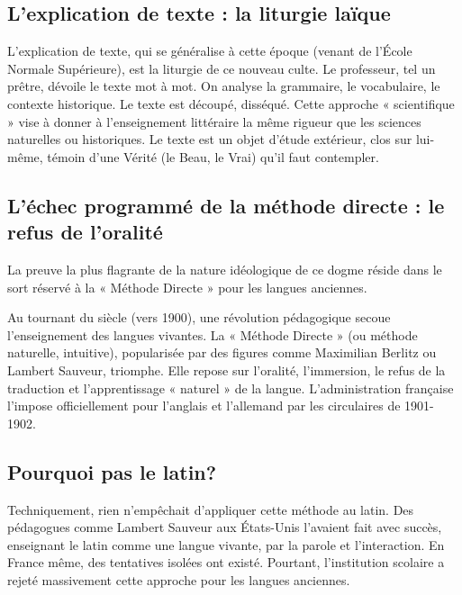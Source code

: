 \subsection{L'explication de texte : la liturgie laïque}

L'explication de texte, qui se généralise à cette époque (venant de l'École Normale Supérieure), est
la liturgie de ce nouveau culte. Le professeur, tel un prêtre, dévoile le texte mot à mot. On
analyse la grammaire, le vocabulaire, le contexte historique. Le texte est découpé, disséqué. Cette
approche « scientifique » vise à donner à l'enseignement littéraire la même rigueur que les sciences
naturelles ou historiques. Le texte est un objet d'étude extérieur, clos sur lui-même, témoin d'une
Vérité (le Beau, le Vrai) qu'il faut contempler.\cite{I-1-3-ref23}



\subsection{L'échec programmé de la méthode directe : le refus de l'oralité}

La preuve la plus flagrante de la nature idéologique de ce dogme réside dans le sort réservé à la «
Méthode Directe » pour les langues anciennes.

Au tournant du siècle (vers 1900), une révolution pédagogique secoue l'enseignement des langues
vivantes. La « Méthode Directe » (ou méthode naturelle, intuitive), popularisée par des figures
comme Maximilian Berlitz ou Lambert Sauveur, triomphe.\cite{I-1-3-ref30} Elle repose sur l'oralité,
l'immersion, le refus de la traduction et l'apprentissage « naturel » de la
langue.\cite{I-1-3-ref32} L'administration française l'impose officiellement pour l'anglais et
l'allemand par les circulaires de 1901-1902.\cite{I-1-3-ref33}



\subsection{Pourquoi pas le latin?}

Techniquement, rien n'empêchait d'appliquer cette méthode au latin. Des pédagogues comme Lambert
Sauveur aux États-Unis l'avaient fait avec succès, enseignant le latin comme une langue vivante, par
la parole et l'interaction.\cite{I-1-3-ref35} En France même, des tentatives isolées ont existé.
Pourtant, l'institution scolaire a rejeté massivement cette approche pour les langues anciennes.

